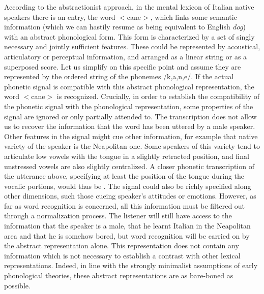 According to the abstractionist approach, in the mental lexicon of Italian native speakers there is an entry, the word $<$cane$>$, which links some semantic information (which we can hastily resume as being equivalent to English \textit{dog}) with an abstract phonological form. This form is characterized by a set of singly necessary and jointly sufficient features. These could be represented by acoustical, articulatory or perceptual information, and arranged as a linear string or as a superposed score. Let us simplify on this specific point and assume they are represented by the ordered string of the phonemes /k,a,n,e/. If the actual phonetic signal is compatible with this abstract phonological representation, the word $<$cane$>$ is recognized. Crucially, in order to establish the compatibility of the phonetic signal with the phonological representation, some properties of the signal are ignored or only partially attended to. The transcription  does not allow us to recover the information that the word has been uttered by a male speaker. Other features in the signal might cue other information, for example that native variety of the speaker is the Neapolitan one. Some speakers of this variety tend to articulate low vowels with the tongue in a slightly retracted position, and final unstressed vowels are also slightly centralized. A closer phonetic transcription of the utterance above, specifying at least the position of the tongue during the vocalic portions, would thus be \textipa{[\textvbaraccent{}k\=*a:n\|x{e}]}. The signal could also be richly specified along other dimensions, such those cueing speaker's attitudes or emotions. However, as far as word recognition is concerned, all this information must be filtered out through a normalization process. The listener will still have access to the information that the speaker is a male, that he learnt Italian in the Neapolitan area and that he is somehow bored, but word recognition will be carried on by the abstract representation  alone. This representation does not contain any information which is not necessary to establish a contrast with other lexical representations. Indeed, in line with the strongly minimalist assumptions of early phonological theories, these abstract representations are as bare-boned as possible.

